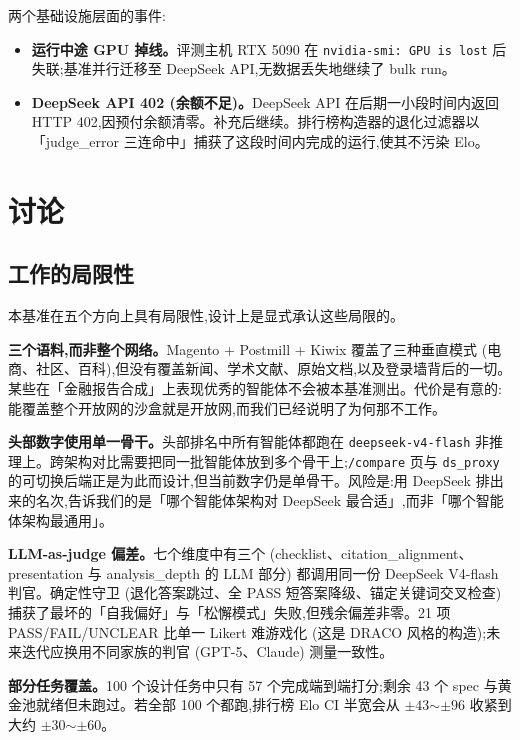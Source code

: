 \documentclass[UTF8,a4paper,12pt,oneside]{ctexart}
\begin{document}
两个基础设施层面的事件:

\begin{itemize}[leftmargin=2em]
\item \textbf{运行中途 GPU 掉线。}评测主机 RTX 5090 在 \texttt{nvidia-smi: GPU is lost} 后失联;基准并行迁移至 DeepSeek API,无数据丢失地继续了 bulk run。
\item \textbf{DeepSeek API 402 (余额不足)。}DeepSeek API 在后期一小段时间内返回 HTTP 402,因预付余额清零。补充后继续。排行榜构造器的退化过滤器以「judge\_error 三连命中」捕获了这段时间内完成的运行,使其不污染 Elo。
\end{itemize}

\section{讨论}

\subsection{工作的局限性}

本基准在五个方向上具有局限性,设计上是显式承认这些局限的。

\textbf{三个语料,而非整个网络。}Magento + Postmill + Kiwix 覆盖了三种垂直模式 (电商、社区、百科),但没有覆盖新闻、学术文献、原始文档,以及登录墙背后的一切。某些在「金融报告合成」上表现优秀的智能体不会被本基准测出。代价是有意的:能覆盖整个开放网的沙盒就是开放网,而我们已经说明了为何那不工作。

\textbf{头部数字使用单一骨干。}头部排名中所有智能体都跑在 \texttt{deepseek-v4-flash} 非推理上。跨架构对比需要把同一批智能体放到多个骨干上;\texttt{/compare} 页与 \texttt{ds\_proxy} 的可切换后端正是为此而设计,但当前数字仍是单骨干。风险是:用 DeepSeek 排出来的名次,告诉我们的是「哪个智能体架构对 DeepSeek 最合适」,而非「哪个智能体架构最通用」。

\textbf{LLM-as-judge 偏差。}七个维度中有三个 (checklist、citation\_alignment、presentation 与 analysis\_depth 的 LLM 部分) 都调用同一份 DeepSeek V4-flash 判官。确定性守卫 (退化答案跳过、全 PASS 短答案降级、锚定关键词交叉检查) 捕获了最坏的「自我偏好」与「松懈模式」失败,但残余偏差非零。21 项 PASS/FAIL/UNCLEAR 比单一 Likert 难游戏化 (这是 DRACO \cite{draco} 风格的构造);未来迭代应换用不同家族的判官 (GPT-5、Claude) 测量一致性。

\textbf{部分任务覆盖。}100 个设计任务中只有 57 个完成端到端打分;剩余 43 个 spec 与黄金池就绪但未跑过。若全部 100 个都跑,排行榜 Elo CI 半宽会从 \(\pm 43\)\(\sim\)\(\pm 96\) 收紧到大约 \(\pm 30\)\(\sim\)\(\pm 60\)。
\end{document}
